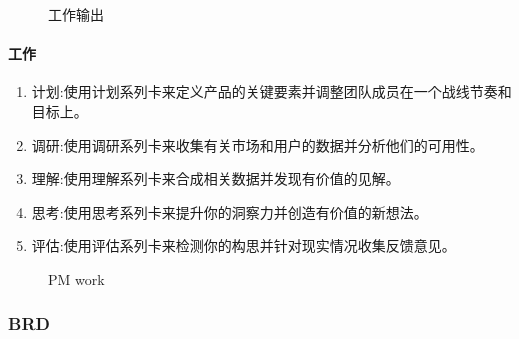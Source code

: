 \documentclass[letterpaper,11pt,english]{sphinxmanual}
\begin{document}
\begin{figure}[H]
\centering
\capstart

\noindent{}
\caption{工作输出\sphinxfootnotemark[405]}\label{\detokenize{chapter_knowledge/steps:id7}}\end{figure}
%
\begin{footnotetext}[405]\sphinxAtStartFootnote
{}
%
\end{footnotetext}\ignorespaces 

\paragraph{工作}
\label{\detokenize{chapter_knowledge/steps:id4}}\begin{enumerate}
%
\item {} 
计划:使用计划系列卡来定义产品的关键要素并调整团队成员在一个战线节奏和目标上。

\item {} 
调研:使用调研系列卡来收集有关市场和用户的数据并分析他们的可用性。

\item {} 
理解:使用理解系列卡来合成相关数据并发现有价值的见解。

\item {} 
思考:使用思考系列卡来提升你的洞察力并创造有价值的新想法。

\item {} 
评估:使用评估系列卡来检测你的构思并针对现实情况收集反馈意见。%
\begin{footnote}[406]\sphinxAtStartFootnote
{}
%
\end{footnote}

\end{enumerate}

\begin{figure}[H]
\centering
\capstart

\noindent{}
\caption{PM work}\label{\detokenize{chapter_knowledge/steps:id8}}\end{figure}


\subsubsection{BRD}
\label{\detokenize{chapter_knowledge/BRD:brd}}\label{\detokenize{chapter_knowledge/BRD::doc}}
\end{document}
